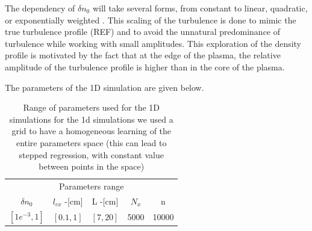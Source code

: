 \documentclass[11pt,a4paper,openany]{report}
\begin{document}
\begin{multicols}{2}
    The dependency of $\delta n_0$ will take several forms, from constant to linear, quadratic, or exponentially weighted \cite{SPR_Krutkin}. This scaling of the turbulence is done to mimic the true turbulence profile (REF) and to avoid the unnatural predominance of turbulence while working with small amplitudes. This exploration of the density profile is motivated by the fact that at the edge of the plasma, the relative amplitude of the turbulence profile is higher than in the core of the plasma.

    The parameters of the 1D simulation are given below.
    \setlength{\tabcolsep}{.03\linewidth}
    \renewcommand{\arraystretch}{1.4}
    \begin{center}
        \begin{table}[H]
            \begin{tabular}{ccccc}
                \toprule
                \multicolumn{5}{c}{Parameters range}                       \\
                \cmidrule{1 -5}
                $\delta n_0$   & $l_{cx}$ -[cm] & L -[cm]  & $N_x$ & n     \\
                \midrule
                $[1e^{-3}, 1]$ & $[0.1,1]$      & $[7,20]$ & 5000  & 10000 \\
                \bottomrule
            \end{tabular}
            \caption{Range of parameters used for the 1D simulations for the 1d simulations we used a grid to have a homogeneous learning of the entire parameters space (this can lead to stepped regression, with constant value between points in the space)}
            \label{1d_params}
        \end{table}
    \end{center}

\end{multicols}
\end{document}

